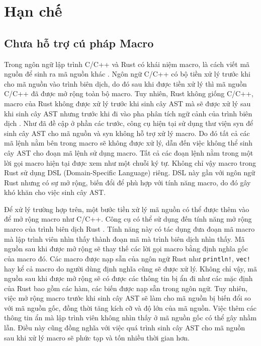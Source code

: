\section{Hạn chế}
\label{sec:limit}

\subsection{Chưa hỗ trợ cú pháp Macro}

Trong ngôn ngữ lập trình C/C++ và Rust có khái niệm macro, là cách viết mã nguồn để sinh ra mã nguồn khác \cite{rustlangMacrosRust}.
Ngôn ngữ C/C++ có bộ tiền xử lý trước khi cho mã nguồn vào trình biên dịch, do đó sau khi được tiền xử lý thì mã nguồn C/C++ đã được mở rộng toàn bộ macro.
Tuy nhiên, Rust không giống C/C++, macro của Rust không được xử lý trước khi sinh cây AST mà sẽ được xử lý sau khi sinh cây AST nhưng trước khi đi vào pha phân tích ngữ cảnh của trình biên dịch \cite{veykrilSourceAnalysis}.
Như đã đề cập ở phần các trước, công cụ hiện tại sử dụng thư viện syn để sinh cây AST cho mã nguồn và syn không hỗ trợ xử lý macro.
Do đó tất cả các mã lệnh nằm bên trong macro sẽ không được xử lý, dẫn đến việc không thể sinh cây AST cho đoạn mã lệnh sử dụng macro.
Tất cả các đoạn lệnh nằm trong một lời gọi macro hiện tại được xem như một chuỗi ký tự.
Không chỉ vậy macro trong Rust sử dụng DSL (Domain-Specific Language) riêng.
DSL này gần với ngôn ngữ Rust nhưng có sự mở rộng, biến đổi để phù hợp với tính năng macro, do đó gây khó khăn cho việc sinh cây AST.

Để xử lý trường hợp trên, một bước tiền xử lý mã nguồn có thể được thêm vào để mở rộng macro như C/C++.
Công cụ có thể sử dụng đến tính năng mở rộng marco của trình biên dịch Rust \cite{rustlangMacroExpansion}.
Tính năng này có tác dụng đưa đoạn mã macro mà lập trình viên nhìn thấy thành đoạn mã mà trình biên dịch nhìn thấy.
Mã nguồn sau khi được mở rộng sẽ thay thế các lời gọi macro bằng định nghĩa gốc của macro đó.
Các macro được nạp sẵn của ngôn ngữ Rust như \texttt{println!}, \texttt{vec!} hay kể cả macro do người dùng định nghĩa cũng sẽ được xử lý.
Không chỉ vậy, mã nguồn sau khi được mở rộng sẽ có được các thông tin bị ẩn đi như các mặc định của Rust bao gồm các hàm, các biến được nạp sẵn trong ngôn ngữ.
Tuy nhiên, việc mở rộng macro trước khi sinh cây AST sẽ làm cho mã nguồn bị biến đổi so với mã nguồn gốc, đồng thời tăng kích cỡ và độ lớn của mã nguồn.
Việc thêm các thông tin ẩn mà lập trình viên không nhìn thấy ở mã nguồn gốc có thể gây nhầm lẫn.
Điều này cũng đồng nghĩa với việc quá trình sinh cây AST cho mã nguồn sau khi xử lý macro sẽ phức tạp và tốn nhiều thời gian hơn.

